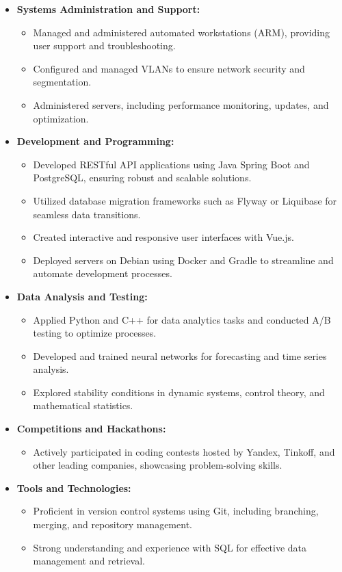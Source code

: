 \documentclass[a4paper,10pt]{article}
\begin{document}
\begin{itemize}
    \item \textbf{Systems Administration and Support:}
    \begin{itemize}
        \item Managed and administered automated workstations (ARM), providing user support and troubleshooting.
        \item Configured and managed VLANs to ensure network security and segmentation.
        \item Administered servers, including performance monitoring, updates, and optimization.
    \end{itemize}

    \item \textbf{Development and Programming:}
    \begin{itemize}
        \item Developed RESTful API applications using Java Spring Boot and PostgreSQL, ensuring robust and scalable solutions.
        \item Utilized database migration frameworks such as Flyway or Liquibase for seamless data transitions.
        \item Created interactive and responsive user interfaces with Vue.js.
        \item Deployed servers on Debian using Docker and Gradle to streamline and automate development processes.
    \end{itemize}

    \item \textbf{Data Analysis and Testing:}
    \begin{itemize}
        \item Applied Python and C++ for data analytics tasks and conducted A/B testing to optimize processes.
        \item Developed and trained neural networks for forecasting and time series analysis.
        \item Explored stability conditions in dynamic systems, control theory, and mathematical statistics.
    \end{itemize}

    \item \textbf{Competitions and Hackathons:}
    \begin{itemize}
        \item Actively participated in coding contests hosted by Yandex, Tinkoff, and other leading companies, showcasing problem-solving skills.
    \end{itemize}

    \item \textbf{Tools and Technologies:}
    \begin{itemize}
        \item Proficient in version control systems using Git, including branching, merging, and repository management.
        \item Strong understanding and experience with SQL for effective data management and retrieval.
    \end{itemize}
\end{itemize}
\end{document}
